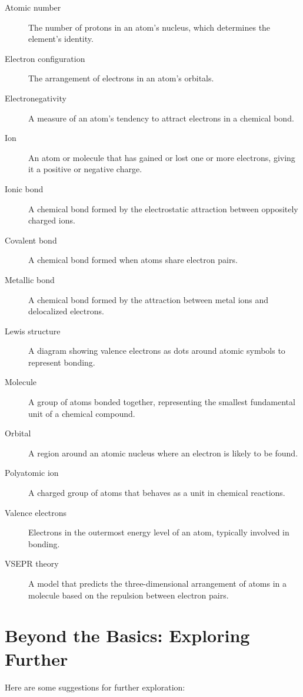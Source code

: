 \begin{description}
    \item[Atomic number] The number of protons in an atom's nucleus, which determines the element's identity.
    \item[Electron configuration] The arrangement of electrons in an atom's orbitals.
    \item[Electronegativity] A measure of an atom's tendency to attract electrons in a chemical bond.
    \item[Ion] An atom or molecule that has gained or lost one or more electrons, giving it a positive or negative charge.
    \item[Ionic bond] A chemical bond formed by the electrostatic attraction between oppositely charged ions.
    \item[Covalent bond] A chemical bond formed when atoms share electron pairs.
    \item[Metallic bond] A chemical bond formed by the attraction between metal ions and delocalized electrons.
    \item[Lewis structure] A diagram showing valence electrons as dots around atomic symbols to represent bonding.
    \item[Molecule] A group of atoms bonded together, representing the smallest fundamental unit of a chemical compound.
    \item[Orbital] A region around an atomic nucleus where an electron is likely to be found.
    \item[Polyatomic ion] A charged group of atoms that behaves as a unit in chemical reactions.
    \item[Valence electrons] Electrons in the outermost energy level of an atom, typically involved in bonding.
    \item[VSEPR theory] A model that predicts the three-dimensional arrangement of atoms in a molecule based on the repulsion between electron pairs.
\end{description}

\section{Beyond the Basics: Exploring Further}

 Here are some suggestions for further exploration:

